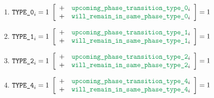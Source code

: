 \begin{enumerate}
    \item
	\If $\texttt{TYPE\_0} _{i} = 1$ \Then
	$ \left[ \begin{array}{clcl}
	    + & \locValidPhaseTransitionTypeZero  _{i} \\
	    + & \locWillRemainInSamePhaseTypeZero _{i} \\
	\end{array} \right]
	= 1 $
    \item
	\If $\texttt{TYPE\_1}  _{i} = 1$ \Then
	$ \left[ \begin{array}{clcl}
	    + & \locValidPhaseTransitionTypeOne  _{i} \\
	    + & \locWillRemainInSamePhaseTypeOne _{i} \\
	\end{array} \right]
	= 1 $
    \item
	\If $\texttt{TYPE\_2}  _{i} = 1$ \Then
	$ \left[ \begin{array}{clcl}
	    + & \locValidPhaseTransitionTypeTwo  _{i} \\
	    + & \locWillRemainInSamePhaseTypeTwo _{i} \\
	\end{array} \right]
	= 1 $
    \item
    \If $\texttt{TYPE\_4} _{i} = 1$ \Then
    $ \left[ \begin{array}{clcl}
        + & \locValidPhaseTransitionTypeFour _{i} \\
        + & \locWillRemainInSamePhaseTypeFour_{i} \\
    \end{array} \right]
    = 1 $
\end{enumerate}
